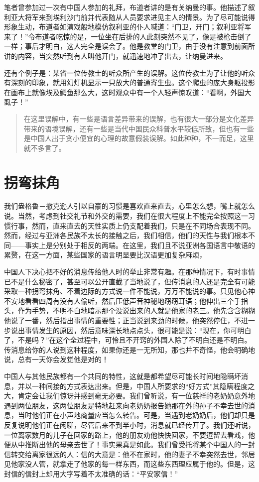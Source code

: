 \documentclass[12pt,oneside]{book}
\begin{document}
\begin{common-format}
笔者曾参加过一次有中国人参加的礼拜，布道者讲的是有关纳曼的事。他描述了叙利亚大将军来到埃利沙门前并代表随从人员要求进见主人的情景。为了尽可能说得形象生动，布道者如演戏般地模仿叙利亚的仆人喊道：“门卫，开门；叙利亚将军来了！”令布道者吃惊的是，一位坐在后排的人此刻突然不见了，像是被枪击倒了一样；事后才明白，这人完全是误会了。他是教堂的门卫，由于没有注意到前面所讲的内容，当突然听到有人叫他开门，就迅速地冲了出去，让纳曼进来。 


还有个例子是：某省一位传教士的听众所产生的误解。这位传教士为了让他的听众有深刻的印象，就用幻灯机显示一只放大的普通寄生虫。这个爬虫的庞大身躯投影在画布上就像埃及鳄鱼那么大，这时观众中有一个人轻声惊叹道：“看啊，外国大虱子！” 

\begin{quotation}
在这里误解中，有一些是语言差异带来的误解，也有很大一部分是文化差异带来的语境误解，还有一些是当代中国民众科普水平较低所致，但也有一些是中国人出于贪小便宜的心理的故意假装误解。如此种种，不一而足，这里就不多言了。
\end{quotation}


\chapter{拐弯抹角}
我们盎格鲁－撤克逊人引以自豪的习惯是喜欢直来直去，心里怎么想，嘴上就怎么说。当然，考虑到社交礼节和外交的需要，我们在很大程度上不能完全按照这一习惯行事，然而，直来直去的天性实质上仍支配着我们，只是在不同场合表现不同。然而，经过与亚洲各民族不太长的接触之后，我们相信，他们的天性与我们根本不同——事实上是分别处于相反的两端。在这里，我们且不说亚洲各国语言中敬语的累赘，在这一方面，某些国家的语言明显要比汉语更加复杂麻烦，



中国人下决心把不好的消息传给他人时的举止非常有趣。在那种情况下，有时事情已不是什么秘密了，甚至可以公开直截了当地说了，但传消息的人还是完全有可能采取一种拐弯抹角、不着边际的方式说一件不能说，万万不能说的事。只见他心神不安地看看四周有没有人偷听，然后压低声音神秘地窃窃耳语；他伸出三个手指头，作为手势，不明不白地暗示那个没说出来的人就是他家的老三。他先含含糊糊他说了一番，然后指出事情的重要性；正当说到来劲的时候，他突然停住，不进一步说出事情发生的原因，然后意味深长地点点头，很可能是说：“现在，你可明白了，不是吗？”在这个全过程中，可怜且不开窍的外国人除了不明白还是不明白。传消息给你的人说到这种程度，如果你还是一无所知，那也并不奇怪，他会明确地说，总有一天你会发觉他是对的！ 

中国人与其他民族都有一个共同的特性，这就是都希望尽可能长时间地隐瞒坏消息，并以一种间接的方式表达出来。但是，中国人所要求的“好方式”其隐瞒程度之大，肯定会让我们惊讶并感到毫无必要。我们曾听说，有一位慈祥的老奶奶意外地遇到两位朋友，这两位朋友是特地赶来向老奶奶报告她那在外的孙子不幸去世的消息，当时他们正在小声地商量应当怎么转告。可是，当遇到老奶奶后，他们却只是反复说明他们正在闲聊，尽管后来不到半小时，消息就已经传开了。我们还听说，一位离家数月的儿子在回家的路上，他的朋友劝他快快回家，不要逗留去看戏，他便从中推断出他的母亲去世了！事实果真是如此。我们曾受托将某个中国人的一封信转交给离家很远的人：信的大意是：他不在家时，他的妻子不幸突然去世，邻居见他家没人管，就拿走了他家的每一样东西，而这些东西理应属于他的。但是，这封信的信封上却用大字写着不太准确的话：“平安家信！” 


\end{common-format}
\end{document}

